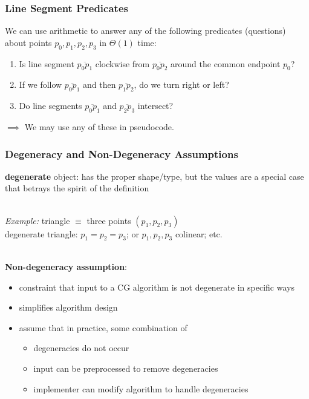 \documentclass{beamer}
\newcommand{\stanza}{ \\~\ }
\begin{document}
\begin{frame} \frametitle{Line Segment Predicates}
We can use arithmetic to answer any of the following predicates (questions)
about points $p_0, p_1, p_2, p_3$ in $\Theta(1)$ time:
\begin{enumerate}
  \item Is line segment $\overline{p_0 p_1}$ clockwise from $\overline{p_0 p_2}$
    around the common endpoint $p_0$?
  \item If we follow $\overline{p_0 p_1}$ and then $\overline{p_1 p_2}$, do we
    turn right or left?
  \item Do line segments $\overline{p_0 p_1}$ and $\overline{p_2 p_3}$
    intersect?
\end{enumerate}

$\implies$ We may use any of these in pseudocode.
\end{frame}

\begin{frame} \frametitle{Degeneracy and Non-Degeneracy Assumptions}
\textbf{degenerate} object: has the proper shape/type, but the values are a
  special case that betrays the spirit of the definition \stanza

\emph{Example:} triangle $\equiv$ three points $(p_1, p_2, p_3)$ \\
degenerate triangle: $p_1=p_2=p_3$; or $p_1, p_2, p_3$ colinear; etc. \stanza

\textbf{Non-degeneracy assumption}:
\begin{itemize}
  \item constraint that input to a CG algorithm is not degenerate in specific ways
  \item simplifies algorithm design
  \item assume that in practice, some combination of
  \begin{itemize}
    \item degeneracies do not occur
    \item input can be preprocessed to remove degeneracies
    \item implementer can modify algorithm to handle degeneracies
  \end{itemize}
\end{itemize}
\end{frame}
\end{document}
